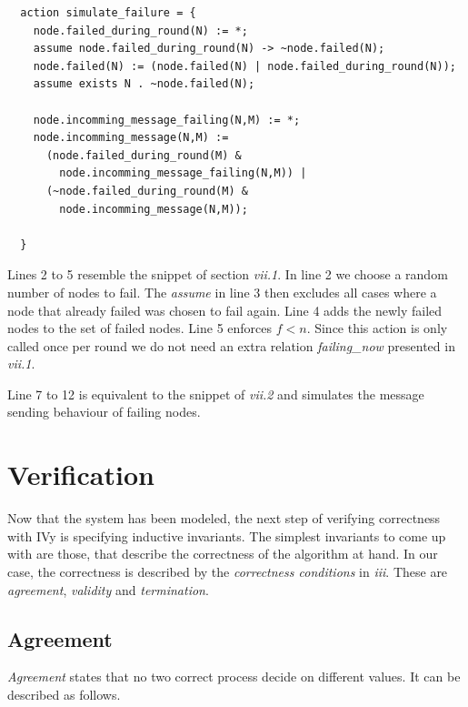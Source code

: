 \documentclass[fleqn]{article}
\begin{document}
\begin{mdframed}[nobreak=true, backgroundcolor=light-gray, roundcorner=10pt,leftmargin=1, rightmargin=1, innerleftmargin=15, innertopmargin=15,innerbottommargin=15, outerlinewidth=1, linecolor=light-gray]
\begin{lstlisting}
  action simulate_failure = {
    node.failed_during_round(N) := *;
    assume node.failed_during_round(N) -> ~node.failed(N);
    node.failed(N) := (node.failed(N) | node.failed_during_round(N));
    assume exists N . ~node.failed(N);

    node.incomming_message_failing(N,M) := *;
    node.incomming_message(N,M) :=
      (node.failed_during_round(M) &
        node.incomming_message_failing(N,M)) |
      (~node.failed_during_round(M) &
        node.incomming_message(N,M));

  }
\end{lstlisting}
\end{mdframed}

Lines 2 to 5 resemble the snippet of section \textit{vii.1}. In line 2 we choose a random number of nodes to fail. The \textit{assume} in line 3 then excludes all cases where a node that already failed was chosen to fail again. Line 4 adds the newly failed nodes to the set of failed nodes. Line 5 enforces $f < n$. Since this action is only called once per round we do not need an extra relation \textit{failing\_now} presented in \textit{vii.1}.

Line 7 to 12 is equivalent to the snippet of \textit{vii.2} and simulates the message sending behaviour of failing nodes.


\section{Verification}

Now that the system has been modeled, the next step of verifying correctness with IVy is specifying inductive invariants. The simplest invariants to come up with are those, that describe the correctness of the algorithm at hand. In our case, the correctness is described by the \textit{correctness conditions} in \textit{iii}. These are \textit{agreement}, \textit{validity} and \textit{termination}.

\subsection{Agreement}
\textit{Agreement} states that no two correct process decide on different values. It can be described as follows.
\end{document}
